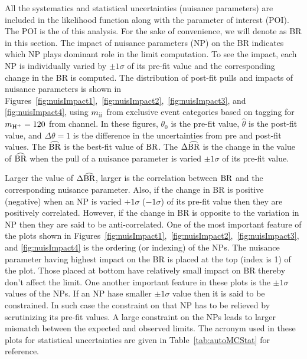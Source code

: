 All the systematics and statistical uncertainties (nuisance parameters) are included in the 
likelihood function along with the parameter of interest (POI). The POI is the \brThb of this analysis.
For the sake of convenience, we will denote \brThb as \rm{BR} in this section. The impact of nuisance
parameters (NP) on the \rm{BR} indicates which NP plays dominant role in the limit computation. To
see the impact, each NP is individually varied by $\pm 1 \sigma$ of its pre-fit value and the 
corresponding change in the \rm{BR} is computed. The distribution of post-fit pulls and impacts of 
nuisance parameters is shown in Figures~\ref{fig:nuisImpact1},~\ref{fig:nuisImpact2},~\ref{fig:nuisImpact3}, and \ref{fig:nuisImpact4}, using $\mjj$ from exclusive event categories based on \PQc tagging 
for $\mHp = 120$ \GeV from \ljets channel. In these figures, $\theta_0$ is the pre-fit value, 
$\widehat{\theta}$ is the post-fit value, and $\Delta\theta = 1$ is the difference in the uncertainties 
from pre and post-fit values. The $\widehat{\rm{BR}}$ is the best-fit value of $\rm{BR}$. 
The $\Delta\widehat{\rm{BR}}$ is the change in the value of $\widehat{\rm{BR}}$ when the pull of a nuisance 
parameter is varied $\pm 1 \sigma$ of its pre-fit value. 

Larger the value of $\Delta\widehat{\rm{BR}}$, larger is the correlation between $\rm{BR}$ and the 
corresponding nuisance parameter. Also, if the change in \rm{BR} is positive (negative) when 
an NP is varied $+1\sigma$ ($-1\sigma$) of its pre-fit value then they are positively correlated. 
However, if the change in \rm{BR} is 
opposite to the variation in NP then they are said to be anti-correlated. One of the most important
feature of the plots shown in Figures~\ref{fig:nuisImpact1},~\ref{fig:nuisImpact2},~\ref{fig:nuisImpact3}, and \ref{fig:nuisImpact4} is the ordering (or indexing) of the NPs. The nuisance parameter having
highest impact on the \rm{BR} is placed at the top (index is 1) of the plot. Those placed at bottom
have relatively small impact on \rm{BR} thereby don't affect the limit. One another important feature
in these plots is the $\pm 1\sigma$ values of the NPs. If an NP hase smaller $\pm 1\sigma$ value then
it is said to be constrained. In such case the constraint on that NP has to be relieved by scrutinizing
its pre-fit values. A large constraint on the NPs leads to larger mismatch between the expected and
observed limits. The acronym used in these plots for statistical uncertainties are given in 
Table~\ref{tab:autoMCStat} for reference. 
 
